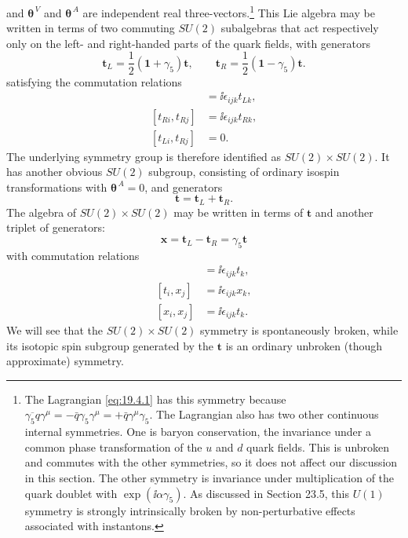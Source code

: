 and $\boldsymbol{\theta}^{\,V}$ and $\boldsymbol{\theta}^{\,A}$ are independent real three-vectors.\footnote{The Lagrangian \eqref{eq:19.4.1} has this symmetry because $\overline{\gamma_5q}\gamma^\mu=-\bar q\gamma_5\gamma^\mu=+\bar q\gamma^\mu\gamma_5$. The Lagrangian also has two other continuous internal symmetries. One is baryon conservation, the invariance under a common phase transformation of the $u$ and $d$ quark fields. This is unbroken and commutes with the other symmetries, so it does not affect our discussion in this section. The other symmetry is invariance under multiplication of the quark doublet with $\exp(\ii\alpha\gamma_5)$. As discussed in Section 23.5, this $U(1)$ symmetry is strongly intrinsically broken by non-perturbative effects associated with instantons.} This Lie algebra may be written in terms of two commuting $SU(2)$ subalgebras that act respectively only on the left- and right-handed parts of the quark fields, with generators
\begin{equation}
\mathbf{t}_L=\frac12(\mathbf{1}+\gamma_5)\mathbf{t},
\qquad
\mathbf{t}_R=\frac12(\mathbf{1}-\gamma_5)\mathbf{t}.
\tag{19.4.3}\label{eq:19.4.3}
\end{equation}
satisfying the commutation relations
\begin{align}
[t_{Li},t_{Lj}]&=\ii\epsilon_{ijk}t_{Lk},
\tag{19.4.4}\label{eq:19.4.4}\\
[t_{Ri},t_{Rj}]&=\ii\epsilon_{ijk}t_{Rk},
\tag{19.4.5}\label{eq:19.4.5}\\
[t_{Li},t_{Rj}]&=0.
\tag{19.4.6}\label{eq:19.4.6}
\end{align}
The underlying symmetry group is therefore identified as $SU(2)\times SU(2)$. It has another obvious $SU(2)$ subgroup, consisting of ordinary isospin transformations with $\boldsymbol{\theta}^{\,A}=0$, and generators
\begin{equation}
\mathbf{t}=\mathbf{t}_L+\mathbf{t}_R.
\tag{19.4.7}\label{eq:19.4.7}
\end{equation}
The algebra of $SU(2)\times SU(2)$ may be written in terms of $\mathbf{t}$ and another triplet of generators:
\begin{equation}
\mathbf{x}=\mathbf{t}_L-\mathbf{t}_R=\gamma_5\mathbf{t}
\tag{19.4.8}\label{eq:19.4.8}
\end{equation}
with commutation relations
\begin{align}
[t_i,t_j]&=\ii\epsilon_{ijk}t_k,
\tag{19.4.9}\label{eq:19.4.9}\\
[t_i,x_j]&=\ii\epsilon_{ijk}x_k,
\tag{19.4.10}\label{eq:19.4.10}\\
[x_i,x_j]&=\ii\epsilon_{ijk}t_k.
\tag{19.4.11}\label{eq:19.4.11}
\end{align}
We will see that the $SU(2)\times SU(2)$ symmetry is spontaneously broken, while its isotopic spin subgroup generated by the $\mathbf{t}$ is an ordinary unbroken (though approximate) symmetry.

